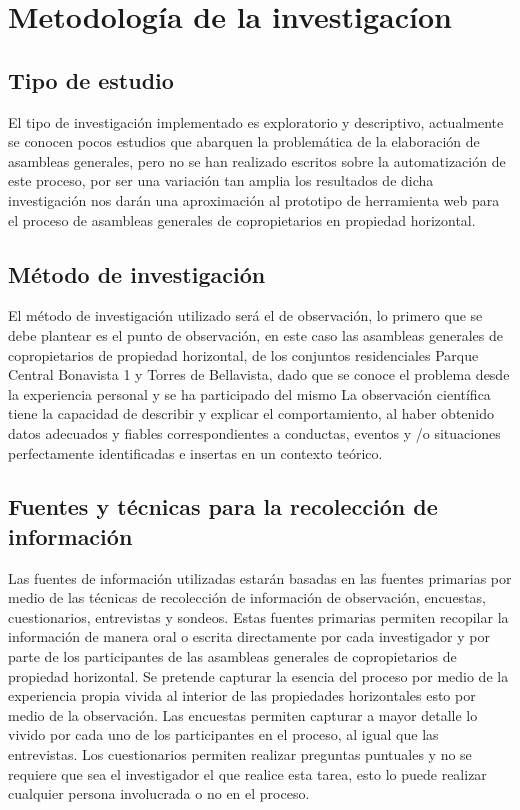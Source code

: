 \section{Metodología de la investigacíon}

\subsection{Tipo de estudio}

El tipo de investigación implementado es exploratorio y descriptivo, actualmente se conocen pocos estudios que abarquen la problemática de la elaboración de asambleas generales, pero no se han realizado escritos sobre la automatización de este proceso, por ser una variación tan amplia los resultados de dicha investigación nos darán una aproximación al prototipo de herramienta web para el proceso de asambleas generales de copropietarios en propiedad horizontal.

\subsection{Método de investigación}

El método de investigación utilizado será el de observación, lo primero que se debe plantear es el punto de observación, en este caso las asambleas generales de copropietarios de propiedad horizontal, de los conjuntos residenciales Parque Central Bonavista 1 y Torres de Bellavista, dado que se conoce el problema desde la experiencia personal y se ha participado del mismo
La observación científica tiene la capacidad de describir y explicar el comportamiento, al haber obtenido datos adecuados y fiables correspondientes a conductas, eventos y /o situaciones perfectamente identificadas e insertas en un contexto teórico.

\subsection{Fuentes y técnicas para la recolección de información}

Las fuentes de información utilizadas estarán basadas en las fuentes primarias por medio de las técnicas de recolección de información de observación, encuestas, cuestionarios, entrevistas y sondeos. Estas fuentes primarias permiten recopilar la información de manera oral o escrita directamente por cada investigador y por parte de los participantes de las asambleas generales de copropietarios de propiedad horizontal.
Se pretende capturar la esencia del proceso por medio de la experiencia propia vivida al interior de las propiedades horizontales esto por medio de la observación. Las encuestas permiten capturar a mayor detalle lo vivido por cada uno de los participantes en el proceso, al igual que las entrevistas. Los cuestionarios permiten realizar preguntas puntuales y no se requiere que sea el investigador el que realice esta tarea, esto lo puede realizar cualquier persona involucrada o no en el proceso.

